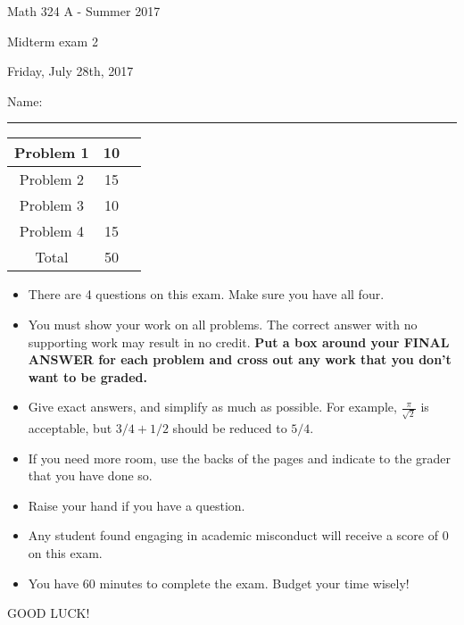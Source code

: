 \documentclass[12 pt]{report}
\begin{document}
\noindent \vfill \noindent \large

\centerline{Math 324 A  - Summer 2017}

\centerline{Midterm exam 2}

\centerline{Friday, July 28th, 2017}

\normalsize

\vfill
\medskip
Name: \rule{10cm}{1pt}

\bigskip

\vfill
\begin{center}
{\large
\begin{tabular}{||c|c|r||}
\hline Problem 1 & 10 & \hspace{10mm} \hfill \\
\hline Problem 2 & 15  & \hspace{10mm} \hfill \\
\hline Problem 3 & 10 & \hspace{10mm} \hfill \\
\hline Problem 4 & 15  & \hspace{10mm} \hfill \\
\hline Total & 50 & \hspace{10mm} \hfill \\
\hline
\end{tabular}
}
\end{center}
\vfill
\begin{itemize}
\item There are 4 questions on this exam. Make sure you have all four.
\item You must show your work on all problems.  The correct answer
with no supporting work may result in no credit. \textbf{Put a box
around your FINAL ANSWER for each problem and cross out any work
that you don't want to be graded.} 
\item Give exact answers, and simplify as much as possible. 
For example, $\frac{\pi}{\sqrt{2}}$ is acceptable, but $3/4 + 1/2$
should be reduced to $5/4$.   

\item If you need more room, use the backs
of the pages and indicate to the grader that you have done so.
\item Raise your hand if you have a question.
\item Any student found engaging in academic misconduct will receive
a score of 0 on this exam.
\item You have 60 minutes to complete the exam.  Budget your time wisely! \\
\end{itemize}
\vfill
\begin{center}GOOD LUCK!\end{center}
\end{document}
